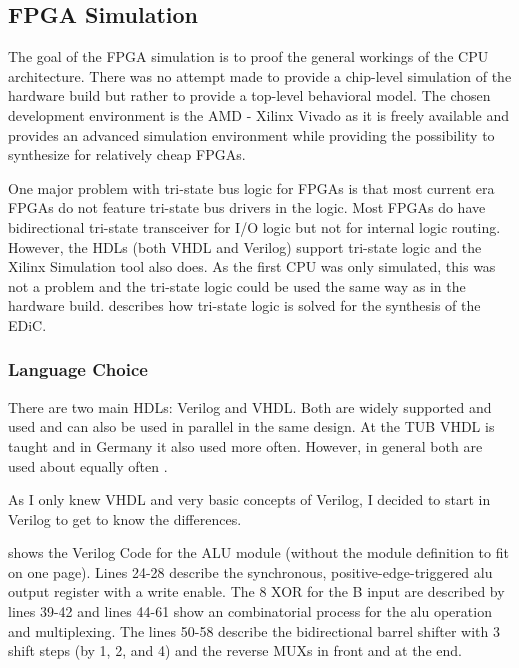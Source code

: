 \subsection{FPGA Simulation}
The goal of the \gls{FPGA} simulation is to proof the general workings of the \gls{CPU} architecture.
There was no attempt made to provide a chip-level simulation of the hardware build but rather to provide a top-level behavioral model.
The chosen development environment is the AMD - Xilinx Vivado \cite{vivado} as it is freely available and provides an advanced simulation environment while providing the possibility to synthesize for relatively cheap \glspl{FPGA}.

One major problem with tri-state bus logic for \glspl{FPGA} is that most current era \glspl{FPGA} do not feature tri-state bus drivers in the logic.
Most \glspl{FPGA} do have bidirectional tri-state transceiver for I/O logic but not for internal logic routing.
However, the \glspl{HDL} (both \gls{VHDL} and Verilog) support tri-state logic and the Xilinx Simulation tool also does.
As the first \gls{CPU} was only simulated, this was not a problem and the tri-state logic could be used the same way as in the hardware build.
 describes how tri-state logic is solved for the synthesis of the \gls{EDiC}.

\subsubsection{Language Choice}
There are two main \glspl{HDL}: Verilog and \gls{VHDL}.
Both are widely supported and used and can also be used in parallel in the same design.
At the \gls{TUB} \gls{VHDL} is taught and in Germany it also used more often.
However, in general both are used about equally often \cite{vhdlVerilog}.

As I only knew \gls{VHDL} and very basic concepts of Verilog, I decided to start in Verilog to get to know the differences.
 shows the Verilog Code for the \gls{ALU} module (without the module definition to fit on one page).
Lines 24-28 describe the synchronous, positive-edge-triggered alu output register with a write enable.
The 8 XOR for the B input are described by lines 39-42 and lines 44-61 show an combinatorial process for the alu operation and multiplexing.
The lines 50-58 describe the bidirectional barrel shifter with 3 shift steps (by 1, 2, and 4) and the reverse \glspl{MUX} in front and at the end.
